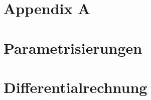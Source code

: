 \documentclass[8pt]{mpscheatsheet}
\begin{document}
    \section{Appendix A}
    
    
    
    
    
    
    
    
    

    \newpage

    \section{Parametrisierungen}
        
        
    \section{Differentialrechnung}
        
        
        
        
        
\end{document}
